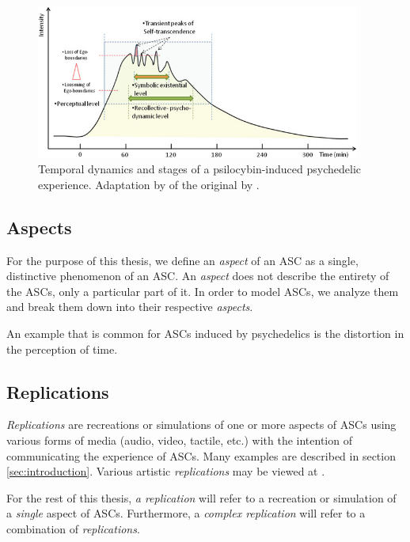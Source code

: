 \begin{figure}[H]
    \centering
    \ifgraphics
        \includegraphics[width=0.95\textwidth]{img/reused/preller2016phenomenology1.png}
    \fi
    \caption{Temporal dynamics and stages of a psilocybin-induced psychedelic experience. Adaptation by \textcite{preller2016phenomenology} of the original by \textcite{leuner1962experimentelle}.}\label{fig:temporal-dynamics}
\end{figure}

\subsection{Aspects}
For the purpose of this thesis, we define an \textit{aspect} of an \ac{ASC} as a single, distinctive phenomenon of an \ac{ASC}. An \textit{aspect} does not describe the entirety of the \acp{ASC}, only a particular part of it. In order to model \acp{ASC}, we analyze them and break them down into their respective \textit{aspects}.

An example that is common for \acp{ASC} induced by psychedelics is the distortion in the perception of time.

\subsection{Replications}
\textit{Replications} are recreations or simulations of one or more aspects of \acp{ASC} using various forms of media (audio, video, tactile, etc.) with the intention of communicating the experience of \acp{ASC}. Many examples are described in section \ref{sec:introduction}. Various artistic \textit{replications} may be viewed at \textcite{pw2022replications}.

For the rest of this thesis, \textit{a replication} will refer to a recreation or simulation of a \textit{single} aspect of \acp{ASC}. Furthermore, a \textit{complex replication} will refer to a combination of \textit{replications}.

